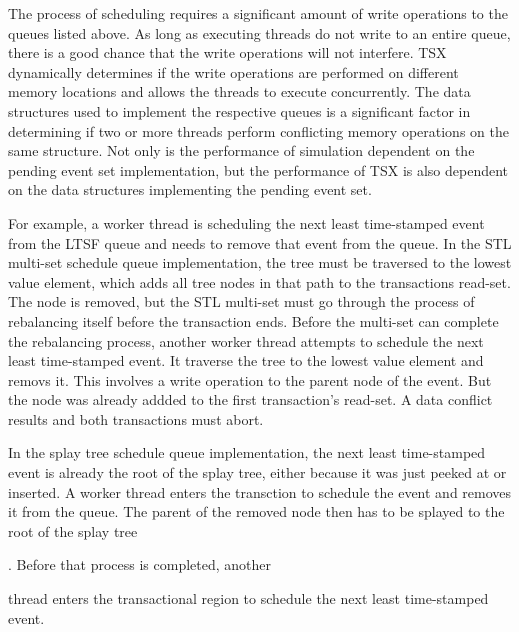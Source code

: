 \documentclass[11pt]{book}
\begin{document}
The process of scheduling requires a significant amount of write operations to
the queues listed above.  As long as executing threads do not write to an entire
queue, there is a good chance that the write operations will not interfere.  TSX
dynamically determines if the write operations are performed on different memory
locations and allows the threads to execute concurrently.  The data structures
used to implement the respective queues is a significant factor in determining
if two or more threads perform conflicting memory operations on the same
structure.  Not only is the performance of simulation dependent on the pending
event set implementation, but the performance of TSX is also dependent on the
data structures implementing the pending event set.

For example, a worker thread is scheduling the next least time-stamped event
from the LTSF queue and needs to remove that event from the queue.  In the STL
multi-set schedule queue implementation, the tree must be traversed to the
lowest value element, which adds all tree nodes in that path to the transactions
read-set.  The node is removed, but the STL multi-set must go through the
process of rebalancing itself before the transaction ends.  Before the multi-set
can complete the rebalancing process, another worker thread attempts to schedule
the next least time-stamped event. It traverse the tree to the lowest value
element and removs it.  This involves a write operation to the parent node of
the event.  But the node was already addded to the first transaction's read-set.
A data conflict results and both transactions must abort.

In the splay tree schedule queue implementation, the next least time-stamped event
is already the root of the splay tree, either because it was just peeked at or
inserted.  A worker thread enters the transction to
schedule the event and removes it from the queue.  The parent of the removed
node then has to be splayed to the root of the splay tree 

.  Before that process is completed, another

thread enters the transactional region to schedule the next least time-stamped
event.
\end{document}
